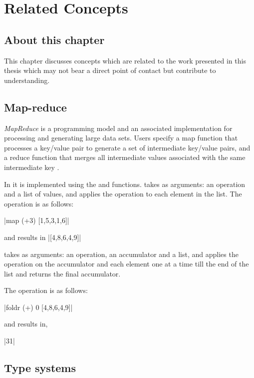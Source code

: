\documentclass[proposal.tex]{subfiles}
\begin{document}
\chapter{Related Concepts}\label{chap:relatedWork}


\section{About this chapter}
This chapter discusses concepts which are related to the work presented in this thesis which may not bear a direct
point of contact but contribute to understanding.

\section{Map-reduce}

\textit{MapReduce} is a programming model and an associated implementation for processing and generating large data
sets.
Users specify a map function that processes a key/value pair to generate a set of intermediate key/value pairs, and
a reduce function that merges all intermediate values associated with the same intermediate key
\cite{dean2008mapreduce}.

In  it is implemented using the  and  functions.
 takes as arguments: an operation and a list of values, and applies the operation to each
element in the list.
The  operation is as follows:

|map (+3) [1,5,3,1,6]|

\noindent and results in
|[4,8,6,4,9]|

\noindent {} takes as arguments: an operation, an accumulator and a list, and applies the operation on the
accumulator and each element one at a time till the end of the list and returns the final accumulator.

The  operation is as follows:

|foldr (+) 0 [4,8,6,4,9]|

\noindent and results in,

|31|
 

\section{Type systems}
\end{document}
